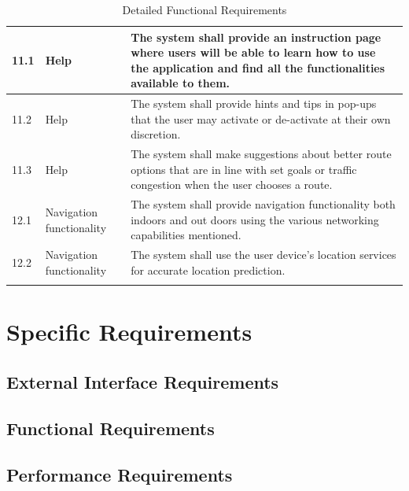 \documentclass[11pt]{article}
\begin{document}
\begin{longtable}{|p{}| p{} | p{} |}
\hline

11.1& Help &The system shall provide an instruction page where users will be able to learn how to use the application and find all the functionalities available to them.\\

\hline

11.2& Help& The system shall provide hints and tips in pop-ups that the user may activate or de-activate at their own discretion.\\

\hline

11.3& Help& The system shall make suggestions about better route options that are in line with set goals or traffic congestion when the user chooses a route.\\

\hline

12.1 &Navigation functionality & The system shall provide navigation functionality both indoors and out doors using the various networking capabilities mentioned.\\

\hline

12.2&Navigation functionality &The system shall use the user device's location services for accurate location prediction.\\

\hline





\caption{Detailed Functional Requirements} %

\label{tab:NavUP Functional Requirements}

\end{longtable}

\section{Specific Requirements}



	\subsection{External Interface Requirements}

	\subsection{Functional Requirements}

	\subsection{Performance Requirements}
\end{document}

